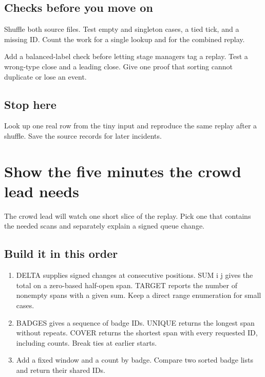 \documentclass[11pt,letterpaper]{article}
\begin{document}
\subsection*{Checks before you move on}

Shuffle both source files. Test empty and singleton cases, a tied tick, and a missing ID. Count the work for a single lookup and for the combined replay.

Add a balanced-label check before letting stage managers tag a replay. Test a wrong-type close and a leading close. Give one proof that sorting cannot duplicate or lose an event.

\subsection*{Stop here}

Look up one real row from the tiny input and reproduce the same replay after a shuffle. Save the source records for later incidents.

\clearpage

\section{Show the five minutes the crowd lead needs}\label{festival:02}

The crowd lead will watch one short slice of the replay. Pick one that contains the needed scans and separately explain a signed queue change.

\subsection*{Build it in this order}

\begin{enumerate}
\item DELTA supplies signed changes at consecutive positions. SUM i j gives the total on a zero-based half-open span. TARGET reports the number of nonempty spans with a given sum. Keep a direct range enumeration for small cases.
\item BADGES gives a sequence of badge IDs. UNIQUE returns the longest span without repeats. COVER returns the shortest span with every requested ID, including counts. Break ties at earlier starts.
\item Add a fixed window and a count by badge. Compare two sorted badge lists and return their shared IDs.
\end{enumerate}
\end{document}
